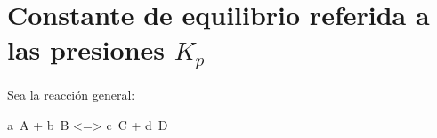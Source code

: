 

\section{Constante de equilibrio referida a las presiones \texorpdfstring{\(K_p\)}{Kp}}\label{sec:constante-de-equilibrio-referida-a-las-presiones}
Sea la reacción general:
\begin{reaction*}
    a\ A\gas{} + b\ B \gas{} <=> c\ C \gas{} + d\ D\gas{}
\end{reaction*}


